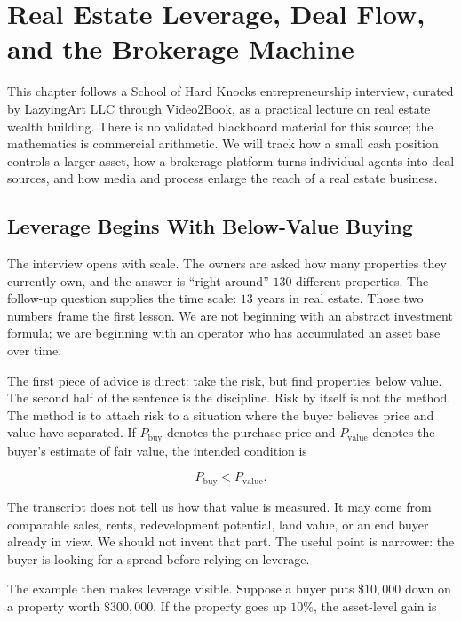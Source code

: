 \chapter{Real Estate Leverage, Deal Flow, and the Brokerage Machine}

This chapter follows a School of Hard Knocks entrepreneurship interview, curated by LazyingArt LLC through Video2Book, as a practical lecture on real estate wealth building. There is no validated blackboard material for this source; the mathematics is commercial arithmetic. We will track how a small cash position controls a larger asset, how a brokerage platform turns individual agents into deal sources, and how media and process enlarge the reach of a real estate business.

\section{Leverage Begins With Below-Value Buying}

The interview opens with scale. The owners are asked how many properties they currently own, and the answer is ``right around'' \(130\) different properties. The follow-up question supplies the time scale: \(13\) years in real estate. Those two numbers frame the first lesson. We are not beginning with an abstract investment formula; we are beginning with an operator who has accumulated an asset base over time.

The first piece of advice is direct: take the risk, but find properties below value. The second half of the sentence is the discipline. Risk by itself is not the method. The method is to attach risk to a situation where the buyer believes price and value have separated. If \(P_{\mathrm{buy}}\) denotes the purchase price and \(P_{\mathrm{value}}\) denotes the buyer's estimate of fair value, the intended condition is

\begin{equation}
P_{\mathrm{buy}} < P_{\mathrm{value}}.
\end{equation}

The transcript does not tell us how that value is measured. It may come from comparable sales, rents, redevelopment potential, land value, or an end buyer already in view. We should not invent that part. The useful point is narrower: the buyer is looking for a spread before relying on leverage.

The example then makes leverage visible. Suppose a buyer puts \(\$10{,}000\) down on a property worth \(\$300{,}000\). If the property goes up \(10\%\), the asset-level gain is

